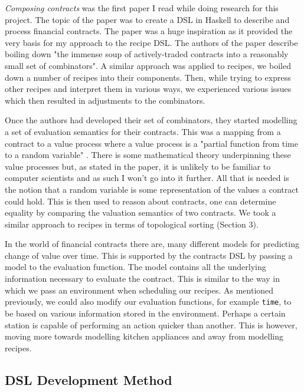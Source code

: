 \documentclass[11pt]{article}
\begin{document}
\textit{Composing contracts} \cite{contracts} was the first paper I read while doing
research for this project. The topic of the paper was to create a DSL in
Haskell to describe and process financial contracts. The paper was a huge
inspiration as it provided the very basis for my approach to the recipe DSL.
The authors of the paper describe boiling down "the immense soup of
actively-traded contracts into a reasonably small set of combinators".
A similar approach was applied to recipes, we boiled down a number of
recipes into their components. Then, while trying to express other
recipes and interpret them in various ways, we experienced various
issues which then resulted in adjustments to the combinators.

\medbreak

Once the authors had developed their set of combinators, they started modelling
a set of evaluation semantics for their contracts. This was a mapping from
a contract to a value process where a value process is a "partial function
from time to a random variable" \cite{contracts}. There is some mathematical
theory underpinning these value processes but, as stated in the paper, it is
unlikely to be familiar to computer scientists and as such I won't go into it
further. All that is needed is the notion that a random variable is some representation
of the values a contract could hold. This is then used to reason about contracts,
one can determine equality by comparing the valuation semantics of two contracts.
We took a similar approach to recipes in terms of topological sorting (Section 3).

\medbreak

In the world of financial contracts there are, many different models for predicting
change of value over time. This is supported by the contracts DSL by passing a 
model to the evaluation function. The model contains all the underlying information
necessary to evaluate the contract. This is similar to the way in which we pass
an environment when scheduling our recipes. As mentioned previously, we could
also modify our evaluation functions, for example \texttt{time}, to be based
on various information stored in the environment. Perhaps a certain station is
capable of performing an action quicker than another. This is however, moving more
towards modelling kitchen appliances and away from modelling recipes.

\subsection{DSL Development Method}
\end{document}
